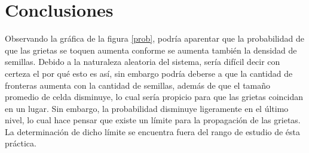 \documentclass{article}
\begin{document}
\section{Conclusiones}\label{con}
Observando la gr\'afica de la figura \ref{prob}, podr\'ia aparentar que la probabilidad de que las grietas se toquen aumenta conforme se aumenta tambi\'en la densidad de semillas. Debido a la naturaleza aleatoria del sistema, ser\'ia dif\'icil decir con certeza el por qu\'e esto es as\'i, sin embargo podr\'ia deberse a que la cantidad de fronteras aumenta con la cantidad de semillas, adem\'as de que el tamaño promedio de celda disminuye, lo cual ser\'ia propicio para que las grietas coincidan en un lugar. Sin embargo, la probabilidad disminuye ligeramente en el \'ultimo nivel, lo cual hace pensar que existe un l\'imite para la propagaci\'on de las grietas. La determinaci\'on de dicho l\'imite se encuentra fuera del rango de estudio de \'esta pr\'actica.


\end{document}
